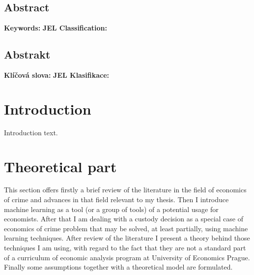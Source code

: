 \documentclass[12pt, twoside]{book} %
\renewcommand{\baselinestretch}{1.5}
\begin{document}
\section*{Abstract}   %
\textbf{Keywords:} \newline
\textbf{JEL Classification:}


\section*{Abstrakt}
\textbf{Klíčová slova:} \newline
\textbf{JEL Klasifikace:}

\tableofcontents    %
\renewcommand{\thepage}{\arabic{page}}
\renewcommand{\baselinestretch}{1.5}


\chapter*{Introduction}     %
\pagestyle{plain}
Introduction text.


\chapter{Theoretical part}    %
This section offers firstly a brief review of the literature in the field of economics of crime and advances in that field relevant to my thesis. Then I introduce machine learning as a tool (or a group of tools) of a potential usage for economists. After that I am dealing with a custody decision as a special case of economics of crime problem that may be solved, at least partially, using machine learning techniques.\newline
After review of the literature I present a theory behind those techniques I am using, with regard to the fact that they are not a standard part of a curriculum of economic analysis program at University of Economics Prague. Finally some assumptions together with a theoretical model are formulated. 
\end{document}
